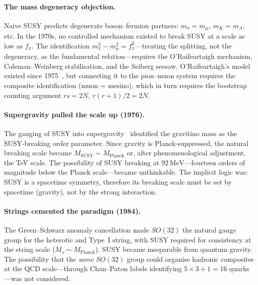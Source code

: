 \documentclass[12pt,a4paper]{article}
\newcommand{\MeV}{\,\text{MeV}}
\newcommand{\fpi}{f_\pi}
\begin{document}
\paragraph{The mass degeneracy objection.}
Naive SUSY predicts degenerate boson--fermion partners: $m_\pi =
m_\mu$, $m_K = m_\Lambda$, etc.  In the 1970s, no controlled
mechanism existed to break SUSY at a scale as low as $\fpi$.
The identification $m_\pi^2 - m_\mu^2 = \fpi^2$---treating the
splitting, not the degeneracy, as the fundamental
relation---requires the O'Raifeartaigh mechanism, Coleman--Weinberg
stabilisation, and the Seiberg seesaw.  O'Raifeartaigh's model
existed since 1975~\cite{ORaifeartaigh}, but connecting it to the
pion--muon system requires the composite identification
(muon = mesino), which in turn requires the bootstrap counting
argument $rs = 2N$, $r(r+1)/2 = 2N$.

\paragraph{Supergravity pulled the scale up (1976).}
The gauging of SUSY into supergravity~\cite{FvNF1976}
identified the gravitino mass as the SUSY-breaking order parameter.
Since gravity is Planck-suppressed, the natural breaking scale
became $M_{\text{SUSY}} \sim M_{\text{Planck}}$ or, after
phenomenological adjustment, the TeV scale.
The possibility of SUSY breaking at $92\MeV$---fourteen orders of
magnitude below the Planck scale---became unthinkable.  The
implicit logic was: SUSY is a spacetime symmetry, therefore its
breaking scale must be set by spacetime (gravity), not by
the strong interaction.

\paragraph{Strings cemented the paradigm (1984).}
The Green--Schwarz anomaly cancellation made $SO(32)$ the natural
gauge group for the heterotic and Type~I string, with SUSY required
for consistency at the string scale ($M_s \sim M_{\text{Planck}}$).
SUSY became inseparable from quantum gravity.
The possibility that the \emph{same} $SO(32)$ group could organise
hadronic composites at the QCD scale---through Chan--Paton labels
identifying $5 \times 3 + 1 = 16$ quarks---was not considered.
\end{document}
